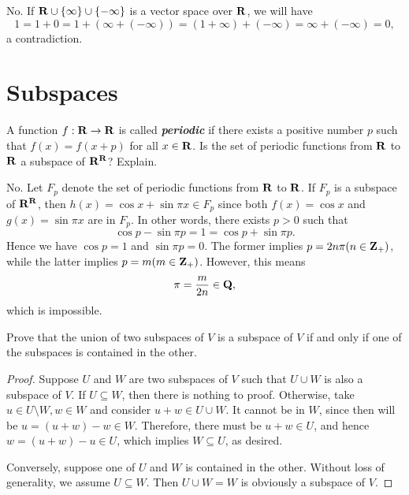 \begin{solution}
	No. If \( \mathbf{R} \cup \{\infty\} \cup \{-\infty\} \) is a vector space over \( \mathbf{R} \), we will have
	\[
		1 = 1 + 0 = 1 + (\infty + (-\infty)) = (1 + \infty) + (-\infty) = \infty + (-\infty) = 0,
	\]
	a contradiction.
\end{solution}



\section{Subspaces}

\begin{exercise}{9}
A function \( f: \mathbf{R} \to \mathbf{R} \) is called \textbf{\textit{periodic}} if there exists a positive number \( p \) such that \( f(x) = f(x + p) \) for all \( x \in \mathbf{R} \). Is the set of periodic functions from \( \mathbf{R} \) to \( \mathbf{R} \) a subspace of \( \mathbf{R}^{\mathbf{R}} \)? Explain.
\end{exercise}

\begin{solution}
	No. Let \( F_{p} \) denote the set of periodic functions from \( \mathbf{R} \) to \( \mathbf{R} \). If \( F_{p} \) is a subspace of \( \mathbf{R}^{\mathbf{R}} \), then \( h(x) = \cos x + \sin\pi x \in F_{p} \) since both \( f(x) = \cos x \) and \( g(x) = \sin\pi x \) are in \( F_{p} \). In other words, there exists \( p > 0 \) such that
	\[
		\cos p - \sin\pi p = 1 = \cos p + \sin\pi p.
	\]
	Hence we have \( \cos p = 1 \) and \( \sin\pi p = 0 \). The former implies \( p = 2n\pi (n \in \mathbf{Z}_{+}) \), while the latter implies \( p = m (m \in \mathbf{Z}_{+}) \). However, this means
	\[
		\pi = \frac{m}{2n} \in \mathbf{Q},
	\]
	which is impossible.
\end{solution}

\begin{exercise}{12}
	Prove that the union of two subspaces of \( V \) is a subspace of \( V \) if and only if one of the subspaces is contained in the other.
\end{exercise}

\begin{proof}
	Suppose \( U \) and \( W \) are two subspaces of \( V \) such that \( U \cup W \) is also a subspace of \( V \). If \( U \subseteq W \), then there is nothing to proof. Otherwise, take \( u \in U \setminus W, w \in W \) and consider \( u + w \in U \cup W \). It cannot be in \( W \), since then will be \( u = (u + w) - w \in W \). Therefore, there must be \( u + w \in U \), and hence \( w = (u + w) - u \in U \), which implies \( W \subseteq U \), as desired.

	Conversely, suppose one of \( U \) and \( W \) is contained in the other. Without loss of generality, we assume \( U \subseteq W \). Then \( U \cup W = W \) is obviously a subspace of \( V \).
\end{proof}

